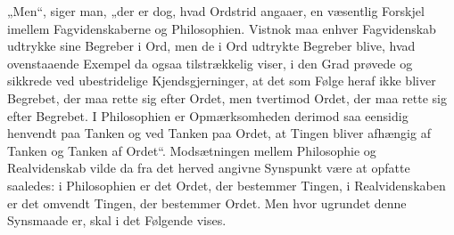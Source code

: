\documentclass[12pt]{book}
\newcommand{\opage}[1]{\marginnote{\footnotesize\textit{[#1]}}}
\begin{document}
„Men“, siger man, „der er dog, hvad Ordstrid angaaer, en væsentlig Forskjel imellem Fagvidenskaberne og Philosophien. Vistnok maa enhver Fagvidenskab udtrykke sine Begreber i
\opage{4}Ord, men de i Ord udtrykte Begreber blive, hvad ovenstaaende Exempel da ogsaa tilstrækkelig viser, i den Grad prøvede og sikkrede ved ubestridelige Kjendsgjerninger, at det som Følge heraf ikke bliver Begrebet, der maa rette sig efter Ordet, men tvertimod Ordet, der maa rette sig efter Begrebet. I Philosophien er Opmærksomheden derimod saa eensidig henvendt paa Tanken og ved Tanken paa Ordet, at Tingen bliver afhængig af Tanken og Tanken af Ordet“. Modsætningen mellem Philosophie og Realvidenskab vilde da fra det herved angivne Synspunkt være at opfatte saaledes: i Philosophien er det Ordet, der bestemmer Tingen, i Realvidenskaben er det omvendt Tingen, der bestemmer Ordet. Men hvor ugrundet denne Synsmaade er, skal i det Følgende vises.
\end{document}
